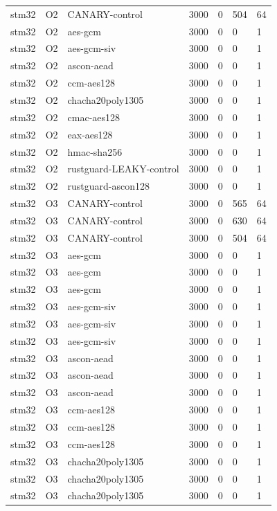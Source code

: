 \begin{table}[t]
\begin{tabular}{lllllll}
    stm32 & O2 & CANARY-control & 3000 & 0 & 504 & 64 \\
    stm32 & O2 & aes-gcm & 3000 & 0 & 0 & 1 \\
    stm32 & O2 & aes-gcm-siv & 3000 & 0 & 0 & 1 \\
    stm32 & O2 & ascon-aead & 3000 & 0 & 0 & 1 \\
    stm32 & O2 & ccm-aes128 & 3000 & 0 & 0 & 1 \\
    stm32 & O2 & chacha20poly1305 & 3000 & 0 & 0 & 1 \\
    stm32 & O2 & cmac-aes128 & 3000 & 0 & 0 & 1 \\
    stm32 & O2 & eax-aes128 & 3000 & 0 & 0 & 1 \\
    stm32 & O2 & hmac-sha256 & 3000 & 0 & 0 & 1 \\
    stm32 & O2 & rustguard-LEAKY-control & 3000 & 0 & 0 & 1 \\
    stm32 & O2 & rustguard-ascon128 & 3000 & 0 & 0 & 1 \\
    stm32 & O3 & CANARY-control & 3000 & 0 & 565 & 64 \\
    stm32 & O3 & CANARY-control & 3000 & 0 & 630 & 64 \\
    stm32 & O3 & CANARY-control & 3000 & 0 & 504 & 64 \\
    stm32 & O3 & aes-gcm & 3000 & 0 & 0 & 1 \\
    stm32 & O3 & aes-gcm & 3000 & 0 & 0 & 1 \\
    stm32 & O3 & aes-gcm & 3000 & 0 & 0 & 1 \\
    stm32 & O3 & aes-gcm-siv & 3000 & 0 & 0 & 1 \\
    stm32 & O3 & aes-gcm-siv & 3000 & 0 & 0 & 1 \\
    stm32 & O3 & aes-gcm-siv & 3000 & 0 & 0 & 1 \\
    stm32 & O3 & ascon-aead & 3000 & 0 & 0 & 1 \\
    stm32 & O3 & ascon-aead & 3000 & 0 & 0 & 1 \\
    stm32 & O3 & ascon-aead & 3000 & 0 & 0 & 1 \\
    stm32 & O3 & ccm-aes128 & 3000 & 0 & 0 & 1 \\
    stm32 & O3 & ccm-aes128 & 3000 & 0 & 0 & 1 \\
    stm32 & O3 & ccm-aes128 & 3000 & 0 & 0 & 1 \\
    stm32 & O3 & chacha20poly1305 & 3000 & 0 & 0 & 1 \\
    stm32 & O3 & chacha20poly1305 & 3000 & 0 & 0 & 1 \\
    stm32 & O3 & chacha20poly1305 & 3000 & 0 & 0 & 1 \\

\end{tabular}
\end{table}
